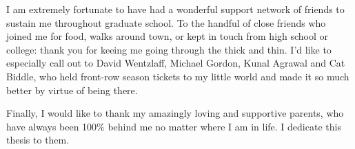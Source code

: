 I am extremely fortunate to have had a wonderful support network of
friends to sustain me throughout graduate school.  To the handful of
close friends who joined me for food, walks around town, or kept in
touch from high school or college: thank you for keeing me going
through the thick and thin.  I'd like to especially call out to
David Wentzlaff, Michael Gordon, Kunal Agrawal and Cat Biddle, who
held front-row season tickets to my little world and made it so much
better by virtue of being there.

Finally, I would like to thank my amazingly loving and supportive
parents, who have always been 100\% behind me no matter where I am
in life.  I dedicate this thesis to them.


%
%
% 
%
%
%
%
%
%
%
%
%
%
%
%
%

